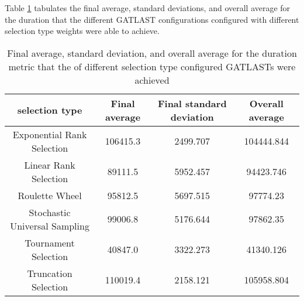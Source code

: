 Table \ref{tab:HP:GA:selectionMethod:duration} tabulates the final average, standard deviations, and overall average for the duration that the different GATLAST configurations configured with different selection type weights were able to achieve.
\begin{table}[tbh!]
\centering
\begin{adjustbox}{trim=0cm 0cm 0cm 0cm, clip=true}
\begin{tabular}{|c|c|c|c|}
\hline
selection type & Final average & Final standard deviation & Overall average\\
\hline
Exponential Rank Selection & 106415.3 & 2499.707 & 104444.844\\\hline
Linear Rank Selection & 89111.5 & 5952.457 & 94423.746\\\hline
Roulette Wheel & 95812.5 & 5697.515 & 97774.23\\\hline
Stochastic Universal Sampling & 99006.8 & 5176.644 & 97862.35\\\hline
Tournament Selection & 40847.0 & 3322.273 & 41340.126\\\hline
Truncation Selection & 110019.4 & 2158.121 & 105958.804\\\hline
\end{tabular}
\end{adjustbox}
\caption{Final average, standard deviation, and overall average for the duration metric that the of different selection type configured GATLASTs were achieved}
\label{tab:HP:GA:selectionMethod:duration}
\end{table}